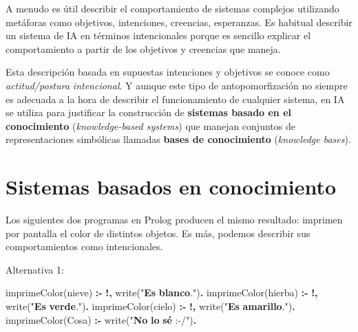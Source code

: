 \documentclass{tufte-handout}
\newenvironment{Shaded}{}{}
\newcommand{\KeywordTok}[1]{\textcolor[rgb]{0.00,0.44,0.13}{\textbf{{#1}}}}
\newcommand{\DataTypeTok}[1]{\textcolor[rgb]{0.56,0.13,0.00}{{#1}}}
\newcommand{\OtherTok}[1]{\textcolor[rgb]{0.00,0.44,0.13}{{#1}}}
\newcommand{\AlertTok}[1]{\textcolor[rgb]{1.00,0.00,0.00}{\textbf{{#1}}}}
\newcommand{\FunctionTok}[1]{\textcolor[rgb]{0.02,0.16,0.49}{{#1}}}
\newcommand{\ErrorTok}[1]{\textcolor[rgb]{1.00,0.00,0.00}{\textbf{{#1}}}}
\newcommand{\NormalTok}[1]{{#1}}
\begin{document}
A menudo es útil describir el comportamiento de sistemas complejos
utilizando metáforas como objetivos, intenciones, creencias, esperanzas.
Es habitual describir un sistema de IA en términos intencionales porque
es sencillo explicar el comportamiento a partir de los objetivos y
creencias que
maneja.

Esta descripción basada en supuestas intenciones y objetivos se conoce
como \emph{actitud/postura intencional}. Y aunque este tipo de
antopomorfización no siempre es adecuada a la hora de describir el
funcionamiento de cualquier sistema, en IA se utiliza para justificar la
construcción de \textbf{sistemas basado en el conocimiento}
(\emph{knowledge-based systems}) que manejan conjuntos de
representaciones simbólicas llamadas \textbf{bases de conocimiento}
(\emph{knowledge bases}).

\section{Sistemas basados en
conocimiento}\label{sistemas-basados-en-conocimiento}

Los siguientes dos programas en Prolog producen el mismo resultado:
imprimen por pantalla el color de distintos objetos. Es más, podemos
describir sus comportamientos como intencionales.

Alternativa 1:

\begin{Shaded}
\begin{Highlighting}[]
\NormalTok{imprimeColor(nieve) }\KeywordTok{:-} \KeywordTok{!,} \FunctionTok{write}\NormalTok{(}\OtherTok{"}\ErrorTok{Es}\AlertTok{ }\ErrorTok{blanco}\OtherTok{."}\NormalTok{)}\KeywordTok{.}
\NormalTok{imprimeColor(hierba) }\KeywordTok{:-} \KeywordTok{!,} \FunctionTok{write}\NormalTok{(}\OtherTok{"}\ErrorTok{Es}\AlertTok{ }\ErrorTok{verde}\OtherTok{."}\NormalTok{)}\KeywordTok{.}
\NormalTok{imprimeColor(cielo) }\KeywordTok{:-} \KeywordTok{!,} \FunctionTok{write}\NormalTok{(}\OtherTok{"}\ErrorTok{Es}\AlertTok{ }\ErrorTok{amarillo}\OtherTok{."}\NormalTok{)}\KeywordTok{.}
\NormalTok{imprimeColor(}\DataTypeTok{Cosa}\NormalTok{) }\KeywordTok{:-} \FunctionTok{write}\NormalTok{(}\OtherTok{"}\ErrorTok{No}\AlertTok{ }\ErrorTok{lo}\AlertTok{ }\ErrorTok{sé}\AlertTok{ }\OtherTok{:-/"}\NormalTok{)}\KeywordTok{.}
\end{Highlighting}
\end{Shaded}
\end{document}
